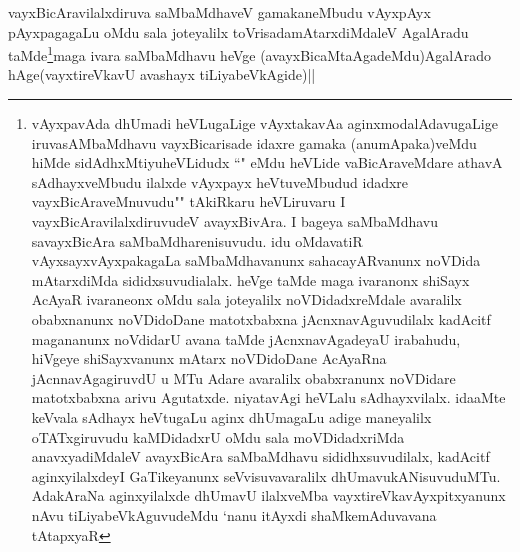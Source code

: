 \begin{artha}
vayxBicAravilalxdiruva saMbaMdhaveV gamakaneMbudu vAyxpAyx pAyxpagagaLu oMdu sala joteyalilx toVrisadamAtarxdiMdaleV AgalAradu taMde\footnote{vAyxpavAda dhUmadi heVLugaLige vAyxtakavAa aginxmodalAdavugaLige iruvasAMbaMdhavu vayxBicarisade idaxre gamaka (anumApaka)veMdu hiMde sidAdhxMtiyuheVLidudx ``\stext" eMdu heVLide vaBicAraveMdare athavA sAdhayxveMbudu ilalxde vAyxpayx heVtuveMbudud idadxre vayxBicAraveMnuvudu"\stext" tAkiRkaru heVLiruvaru I vayxBicAravilalxdiruvudeV avayxBivAra. I bageya saMbaMdhavu savayxBicAra saMbaMdharenisuvudu. idu oMdavatiR vAyxsayxvAyxpakagaLa saMbaMdhavanunx sahacayARvanunx noVDida mAtarxdiMda sididxsuvudialalx. heVge taMde maga ivaranonx shiSayx AcAyaR ivaraneonx oMdu sala joteyalilx noVDidadxreMdale avaralilx obabxnanunx noVDidoDane matotxbabxna jAcnxnavAguvudilalx kadAcitf magananunx noVdidarU avana taMde jAcnxnavAgadeyaU irabahudu, hiVgeye shiSayxvanunx mAtarx noVDidoDane AcAyaRna jAcnnavAgagiruvdU u MTu  Adare avaralilx obabxranunx noVDidare matotxbabxna arivu Agutatxde. niyatavAgi heVLalu sAdhayxvilalx. idaaMte keVvala sAdhayx heVtugaLu aginx dhUmagaLu adige maneyalilx oTATxgiruvudu kaMDidadxrU oMdu sala moVDidadxriMda anavxyadiMdaleV avayxBicAra saMbaMdhavu sididhxsuvudilalx, kadAcitf aginxyilalxdeyI GaTikeyanunx seVvisuvavaralilx dhUmavukANisuvuduMTu. AdakAraNa aginxyilalxde dhUmavU ilalxveMba vayxtireVkavAyxpitxyanunx nAvu tiLiyabeVkAguvudeMdu `nanu itAyxdi shaMkemAduvavana tAtapxyaR}maga ivara saMbaMdhavu heVge (avayxBicaMtaAgadeMdu)AgalArado hAge(vayxtireVkavU avashayx tiLiyabeVkAgide)||
\end{artha}

